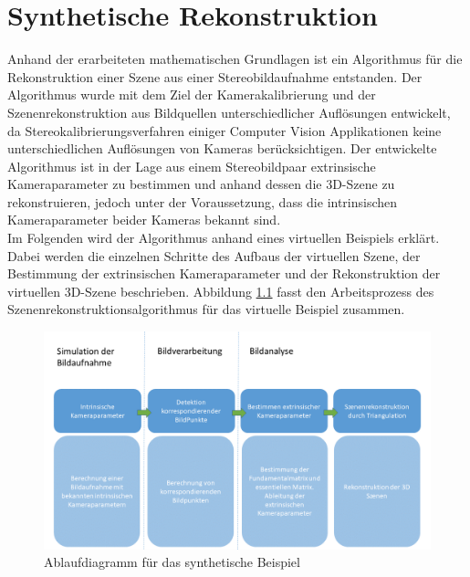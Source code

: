 \chapter{Synthetische Rekonstruktion}
\label{sec:minimal} 

Anhand der erarbeiteten mathematischen Grundlagen ist ein Algorithmus für die Rekonstruktion einer Szene aus einer Stereobildaufnahme entstanden. Der Algorithmus wurde mit dem Ziel der Kamerakalibrierung und der Szenenrekonstruktion aus Bildquellen unterschiedlicher Auflösungen entwickelt, da Stereokalibrierungsverfahren einiger Computer Vision Applikationen keine unterschiedlichen Auflösungen von Kameras berücksichtigen. Der entwickelte Algorithmus ist in der Lage aus einem Stereobildpaar extrinsische Kameraparameter zu bestimmen und anhand dessen die 3D-Szene zu rekonstruieren, jedoch unter der Voraussetzung, dass die intrinsischen Kameraparameter beider Kameras bekannt sind.\\

Im Folgenden wird der Algorithmus anhand eines virtuellen Beispiels erklärt. Dabei werden die einzelnen Schritte des Aufbaus der virtuellen Szene, der Bestimmung der extrinsischen Kameraparameter und der Rekonstruktion der virtuellen 3D-Szene beschrieben. Abbildung \ref{fig:ArbeitsProzessVirtuell} fasst den Arbeitsprozess des Szenenrekonstruktionsalgorithmus für das virtuelle Beispiel zusammen. \\




\begin{figure}[!htb]%
	\centering
	\includegraphics[width=1.\linewidth]{images/NEU_Virtuel_Arbeitsprozess.png}
	\caption[Ablaufdiagram]{Ablaufdiagramm für das synthetische Beispiel}
	\label{fig:ArbeitsProzessVirtuell}
\end{figure}


